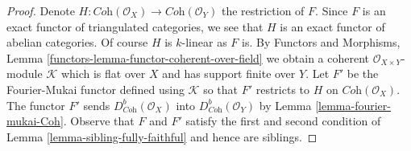 \documentclass{stacks-project}
\theoremstyle{plain}
\theoremstyle{definition}
\theoremstyle{remark}
\numberwithin{equation}{subsection}
\begin{document}
\begin{proof}
Denote $H : \textit{Coh}(\mathcal{O}_X) \to \textit{Coh}(\mathcal{O}_Y)$
the restriction of $F$. Since $F$ is an exact functor of triangulated
categories, we see that $H$ is an exact functor of abelian categories.
Of course $H$ is $k$-linear as $F$ is. By
Functors and Morphisms, Lemma \ref{functors-lemma-functor-coherent-over-field}
we obtain a coherent $\mathcal{O}_{X \times Y}$-module
$\mathcal{K}$ which is flat over $X$ and has support finite over $Y$.
Let $F'$ be the Fourier-Mukai functor defined using $\mathcal{K}$
so that $F'$ restricts to $H$ on $ \textit{Coh}(\mathcal{O}_X)$.
The functor $F'$ sends $D^b_{\textit{Coh}}(\mathcal{O}_X)$
into $D^b_{\textit{Coh}}(\mathcal{O}_Y)$ by
Lemma \ref{lemma-fourier-mukai-Coh}.
Observe that $F$ and $F'$ satisfy the first and second
condition of Lemma \ref{lemma-sibling-fully-faithful} and hence are siblings.
\end{proof}
\end{document}
